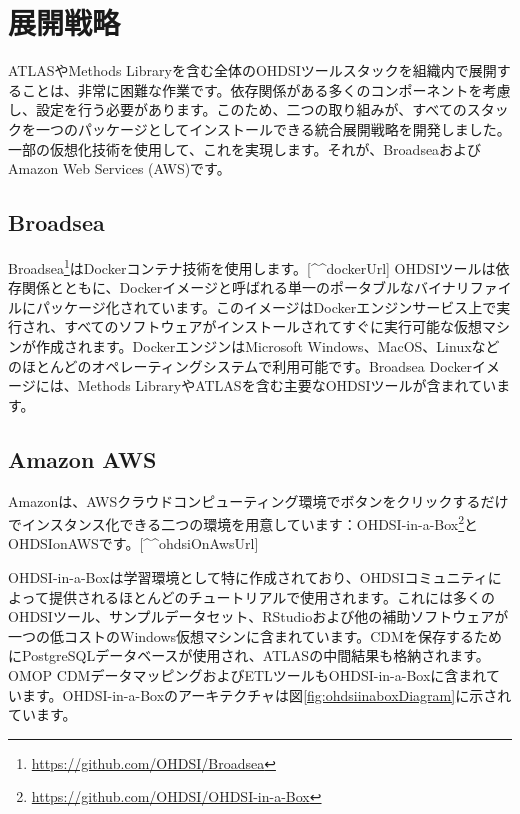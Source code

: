 \documentclass[
  11pt]{book}
\theoremstyle{definition}
\theoremstyle{definition}
\theoremstyle{definition}
\theoremstyle{definition}
\theoremstyle{remark}
\begin{document}
\section{展開戦略}\label{ux5c55ux958bux6226ux7565}

ATLASやMethods Libraryを含む全体のOHDSIツールスタックを組織内で展開することは、非常に困難な作業です。依存関係がある多くのコンポーネントを考慮し、設定を行う必要があります。このため、二つの取り組みが、すべてのスタックを一つのパッケージとしてインストールできる統合展開戦略を開発しました。一部の仮想化技術を使用して、これを実現します。それが、BroadseaおよびAmazon Web Services (AWS)です。 

\subsection{Broadsea}\label{broadsea}

Broadsea\footnote{\url{https://github.com/OHDSI/Broadsea}}はDockerコンテナ技術を使用します。{[}\^{}\^{}dockerUrl{]} OHDSIツールは依存関係とともに、Dockerイメージと呼ばれる単一のポータブルなバイナリファイルにパッケージ化されています。このイメージはDockerエンジンサービス上で実行され、すべてのソフトウェアがインストールされてすぐに実行可能な仮想マシンが作成されます。DockerエンジンはMicrosoft Windows、MacOS、Linuxなどのほとんどのオペレーティングシステムで利用可能です。Broadsea Dockerイメージには、Methods LibraryやATLASを含む主要なOHDSIツールが含まれています。 

\subsection{Amazon AWS}\label{amazon-aws}

Amazonは、AWSクラウドコンピューティング環境でボタンをクリックするだけでインスタンス化できる二つの環境を用意しています：OHDSI-in-a-Box\footnote{\url{https://github.com/OHDSI/OHDSI-in-a-Box}}とOHDSIonAWSです。{[}\^{}\^{}ohdsiOnAwsUrl{]} 

OHDSI-in-a-Boxは学習環境として特に作成されており、OHDSIコミュニティによって提供されるほとんどのチュートリアルで使用されます。これには多くのOHDSIツール、サンプルデータセット、RStudioおよび他の補助ソフトウェアが一つの低コストのWindows仮想マシンに含まれています。CDMを保存するためにPostgreSQLデータベースが使用され、ATLASの中間結果も格納されます。OMOP CDMデータマッピングおよびETLツールもOHDSI-in-a-Boxに含まれています。OHDSI-in-a-Boxのアーキテクチャは図\ref{fig:ohdsiinaboxDiagram}に示されています。
\end{document}
